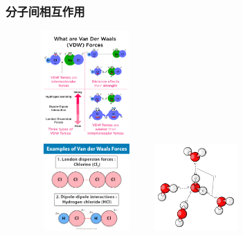 \frame
{
	\frametitle{分子间相互作用}
\begin{figure}[h!]
\centering
\vspace{-10.5pt}
\includegraphics[height=1.65in ,width=1.55in,viewport=0 0 1150 1280,clip]{Figures/van_der_Waals-Force.png}\\
\includegraphics[height=1.30in,width=1.60in,viewport=0 25 600 530,clip]{Figures/Van-Der-Waals-Forces-Bond-Interactions-Examples.jpg}
\includegraphics[height=1.30in,width=1.60in,viewport=0 0 280 230,clip]{Figures/water-H-bond.png}
\label{van_der_Waalss}
\end{figure}
}

